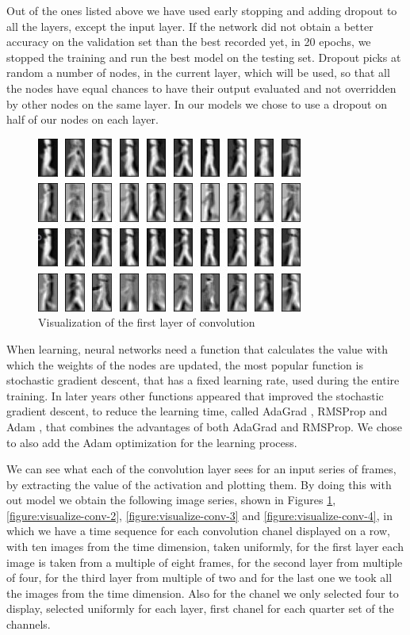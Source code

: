 \documentclass[12pt]{article}
\theoremstyle{definition}
\begin{document}
	Out of the ones listed above we have used early stopping and adding dropout to all the layers, except the input layer. If the network did not obtain a better accuracy on the validation set than the best recorded yet, in 20 epochs, we stopped the training and run the best model on the testing set. Dropout picks at random a number of nodes, in the current layer, which will be used, so that all the nodes have equal chances to have their output evaluated and not overridden by other nodes on the same layer. In our models we chose to use a dropout on half of our nodes on each layer.

	\begin{figure}[ht]
		\includegraphics[width=\textwidth]{conv-see/visualization-2.jpg}
		\caption{Visualization of the first layer of convolution}
		\label{figure:visualize-conv-1}
	\end{figure}

	When learning, neural networks need a function that calculates the value with which the weights of the nodes are updated, the most popular function is stochastic gradient descent, that has a fixed learning rate, used during the entire training. In later years other functions appeared that improved the stochastic gradient descent, to reduce the learning time, called AdaGrad \cite{adagrad-optimizer}, RMSProp \cite{rmsprop-optimizer} and Adam \cite{adam-optimizer}, that combines the advantages of both AdaGrad and RMSProp.
	We chose to also add the Adam optimization for the learning process.

	We can see what each of the convolution layer sees for an input series of frames, by extracting the value of the activation and plotting them. By doing this with out model we obtain the following image series, shown in Figures \ref{figure:visualize-conv-1}, \ref{figure:visualize-conv-2}, \ref{figure:visualize-conv-3} and \ref{figure:visualize-conv-4}, in which we have a time sequence for each convolution chanel displayed on a row, with ten images from the time dimension, taken uniformly, for the first layer each image is taken from a multiple of eight frames, for the second layer from multiple of four, for the third layer from multiple of two and for the last one we took all the images from the time dimension. Also for the chanel we only selected four to display, selected uniformly for each layer, first chanel for each quarter set of the channels.
\end{document}
